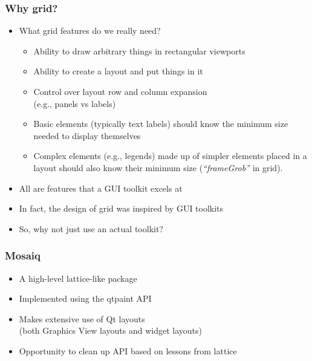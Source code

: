 \documentclass[compress]{beamer}
\begin{document}
\begin{frame}
  \frametitle{Why grid?}
  \begin{itemize}
  \item What grid features do we really need?
    \begin{itemize}
    \item Ability to draw arbitrary things in rectangular viewports
    \item Ability to create a layout and put things in it
    \item Control over layout row and column expansion\\ (e.g., panels vs labels)
    \item Basic elements (typically text labels) should know the minimum
      size needed to display themselves
    \item Complex elements (e.g., legends) made up of simpler elements
      placed in a layout should also know their minimum size
      (\textit{``frameGrob''} in grid).
    \end{itemize}
  \item<2>{ All are features that a GUI toolkit excels at }
  \item<2>{ In fact, the design of grid was inspired by GUI toolkits }
  \item<2>{ So, why not just use an actual toolkit? } 
  \end{itemize}
\end{frame}


\begin{frame}
  \frametitle{Mosaiq}
  \begin{itemize}
  \item A high-level lattice-like package
  \item Implemented using the qtpaint API
  \item Makes extensive use of Qt layouts\\ (both Graphics View layouts
    and widget layouts)
  \item Opportunity to clean up API based on lessons from lattice
  \end{itemize}
\end{frame}
\end{document}
